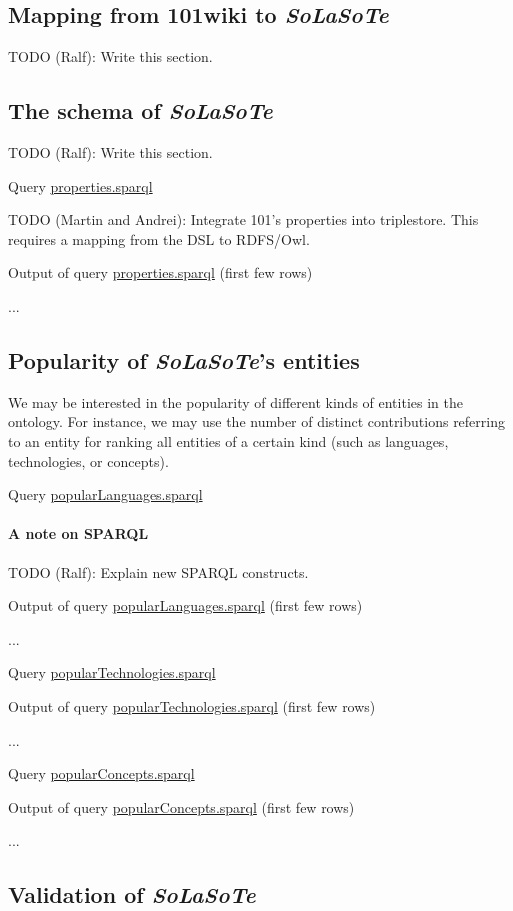 \documentclass{article}
\newcommand{\ooo}[1]{\textsf{101#1}}%
\newcommand{\todo}[2]{\noindent{}TODO (#1): #2}
\newcommand{\solasote}{{\itshape\textsf{SoLaSoTe}}}
\newcommand{\sparqlnote}[1]{
\paragraph{A note on SPARQL} #1
}
\newcommand{\sparql}[1]{%
\medskip

\noindent
\begin{boxedminipage}{\hsize}
\hfill{}Query \underline{#1.sparql}

\end{boxedminipage}
\medskip
}
\newcommand{\partialOutput}[2]{%

\medskip

\noindent
\begin{boxedminipage}{\hsize}
\hfill{}Output of query \underline{#2.sparql} (first few rows)

{\large{}...}
\end{boxedminipage}
\medskip
}
\begin{document}

\subsection{Mapping from \ooo{wiki} to \solasote}
\label{S:mapping}

\todo{Ralf}{Write this section.}


\subsection{The schema of \solasote}

\todo{Ralf}{Write this section.}

\sparql{properties}

\todo{Martin and Andrei}{Integrate 101's properties into
  triplestore. This requires a mapping from the DSL to RDFS/Owl.}

\partialOutput{7}{properties}


\subsection{Popularity of \solasote's entities}

We may be interested in the popularity of different kinds of entities
in the ontology. For instance, we may use the number of distinct
contributions referring to an entity for ranking all entities of a
certain kind (such as languages, technologies, or concepts). 

\sparql{popularLanguages}

\sparqlnote{\todo{Ralf}{Explain new SPARQL constructs.}}

\partialOutput{7}{popularLanguages}

\sparql{popularTechnologies}

\partialOutput{7}{popularTechnologies}

\sparql{popularConcepts}

\partialOutput{7}{popularConcepts}


\subsection{Validation of \solasote}
\end{document}
